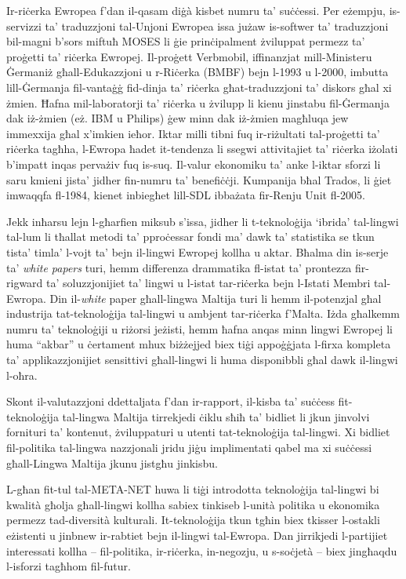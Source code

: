 \documentclass[]{../../metanetpaper}
\begin{document}
\begin{multicols}{2}
Ir-riċerka Ewropea f’dan il-qasam diġà kisbet numru ta’ suċċessi. Per eżempju, is-servizzi ta’ traduzzjoni tal-Unjoni Ewropea issa jużaw is-softwer ta’ traduzzjoni bil-magni  b’sors miftuħ MOSES li ġie prinċipalment żviluppat permezz ta’ proġetti ta’ riċerka Ewropej. Il-proġett Verbmobil, iffinanzjat mill-Ministeru Ġermaniż għall-Edukazzjoni u r-Riċerka (BMBF) bejn l-1993 u l-2000, imbutta lill-Ġermanja fil-vantaġġ fid-dinja ta’ riċerka għat-traduzzjoni ta’ diskors għal xi żmien. Ħafna mil-laboratorji ta’ riċerka u żvilupp li kienu jinstabu fil-Ġermanja dak iż-żmien (eż. IBM u Philips) ġew minn dak iż-żmien magħluqa jew immexxija għal x’imkien ieħor. Iktar milli tibni fuq ir-riżultati tal-proġetti ta’ riċerka tagħha, l-Ewropa ħadet it-tendenza li ssegwi attivitajiet ta’ riċerka iżolati b’impatt inqas pervażiv fuq is-suq. Il-valur ekonomiku ta’ anke l-iktar sforzi li saru kmieni jista’ jidher fin-numru ta’ benefiċċji. Kumpanija bħal Trados, li ġiet imwaqqfa fl-1984, kienet inbiegħet lill-SDL ibbażata fir-Renju Unit fl-2005.



Jekk inħarsu lejn l-għarfien miksub s’issa, jidher li t-teknoloġija ‘ibrida’ tal-lingwi tal-lum li tħallat metodi ta’ pproċessar fondi ma’ dawk ta’ statistika se tkun tista’ timla’ l-vojt ta’ bejn il-lingwi Ewropej kollha u aktar. Bħalma din is-serje ta’ \emph{white papers} turi, hemm differenza drammatika fl-istat ta’ prontezza fir-rigward ta’ soluzzjonijiet ta’ lingwi u l-istat tar-riċerka bejn l-Istati Membri tal-Ewropa. Din il-\emph{white} paper għall-lingwa Maltija turi li hemm il-potenzjal għal industrija tat-teknoloġija tal-lingwi u ambjent tar-riċerka f’Malta. Iżda għalkemm numru ta’ teknoloġiji u riżorsi jeżisti, hemm ħafna anqas minn lingwi Ewropej li huma  ``akbar'' u ċertament mhux biżżejjed biex tiġi appoġġjata l-firxa kompleta ta’ applikazzjonijiet sensittivi għall-lingwi li huma disponibbli għal dawk il-lingwi l-oħra.

Skont il-valutazzjoni ddettaljata f’dan ir-rapport, il-kisba ta’ suċċess fit-teknoloġija tal-lingwa Maltija tirrekjedi ċiklu sħiħ ta’ bidliet li jkun jinvolvi fornituri ta’ kontenut, żviluppaturi u utenti tat-teknoloġija tal-lingwi. Xi bidliet fil-politika tal-lingwa nazzjonali jridu jiġu implimentati qabel ma xi suċċessi għall-Lingwa Maltija jkunu jistgħu jinkisbu.

L-għan fit-tul tal-META-NET huwa li tiġi introdotta teknoloġija tal-lingwi bi kwalità għolja għall-lingwi kollha sabiex tinkiseb l-unità politika u ekonomika permezz tad-diversità kulturali. It-teknoloġija tkun tgħin biex tkisser l-ostakli eżistenti u jinbnew ir-rabtiet bejn il-lingwi tal-Ewropa. Dan jirrikjedi l-partijiet interessati kollha – fil-politika, ir-riċerka, in-negozju, u s-soċjetà – biex jingħaqdu l-isforzi tagħhom fil-futur.


\end{multicols}
\end{document}
